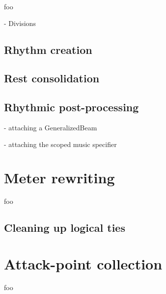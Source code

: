 foo

- Divisions

\subsection{Rhythm creation}

\subsection{Rest consolidation}

\subsection{Rhythmic post-processing}

- attaching a GeneralizedBeam

- attaching the scoped music specifier

\section{Meter rewriting}

foo

\subsection{Cleaning up logical ties}

\section{Attack-point collection}

foo